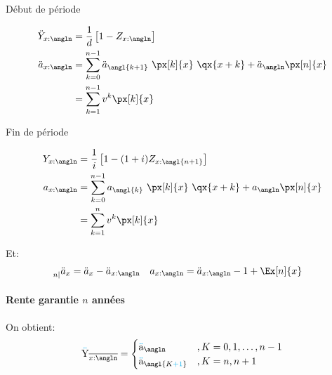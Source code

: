 \documentclass[10pt, french]{article}
\newcommand\cumlaut[2][black]{\stackon[.33ex]{#2}{\textcolor{#1}{\kern-.04ex.\kern-.2ex.}}}
\begin{document}
\begin{multicols*}{3}
\begin{minipage}[t]{0.5\columnwidth}
\begin{center}
Début de période
\end{center}
\begin{align*}
	\ddot{Y}_{x:\angln} 
	&=	\frac{1}{d} \left[ 1 - Z_{x:\angln} \right]	\\
	\ddot{a}_{x:\angln}	
	&=	\sum_{k = 0}^{n - 1} \ddot{a}_{\angl{k + 1}} \ \px[k]{x} \ \qx{x + k}	+	\ddot{a}_{\angln} \px[n]{x}	\\
	&=	\sum_{k = 1}^{n - 1} v^{k} \px[k]{x}
\end{align*}
\end{minipage}
\begin{minipage}[t]{0.5\columnwidth}
\begin{center}
Fin de période
\end{center}
\begin{align*}
	Y_{x:\angln} 
	&=	\frac{1}{i}\left[ 1 - (1 + i) Z_{x:\angl{n + 1}}\right] 	\\
	a_{x:\angln}	
	&=	\sum_{k = 0}^{n - 1} a_{\angl{k}} \ \px[k]{x} \ \qx{x + k}	+	a_{\angln} \px[n]{x}	\\
	&=	\sum_{k = 1}^{n} v^{k} \px[k]{x}
\end{align*}	
\end{minipage}
\setlength{\mathindent}{1cm}

Et:
\begin{align*}
	\prescript{}{n|}{\ddot{a}_{x}}
	&=	\ddot{a}_{x} - \ddot{a}_{x:\angln}	&
	a_{x:\angln}
	&=	\ddot{a}_{x:\angln} - 1 + \Ex[n]{x}
\end{align*}

\paragraph{Rente garantie $n$ années}
On obtient:
\begin{align*}
	\cumlaut[cyan]{Y}_{\overline{x:\angln}} 
	&= 	\begin{cases}
			\cumlaut[cyan]{a}_{\angln}	& , K = 0, 1, \dots, n - 1 \\
			\cumlaut[cyan]{a}_{\angl{K \textcolor{cyan}{+ 1}}}			& , K = n, n + 1 \\
		\end{cases} 	\\
\end{align*}


\end{multicols*}
\end{document}

